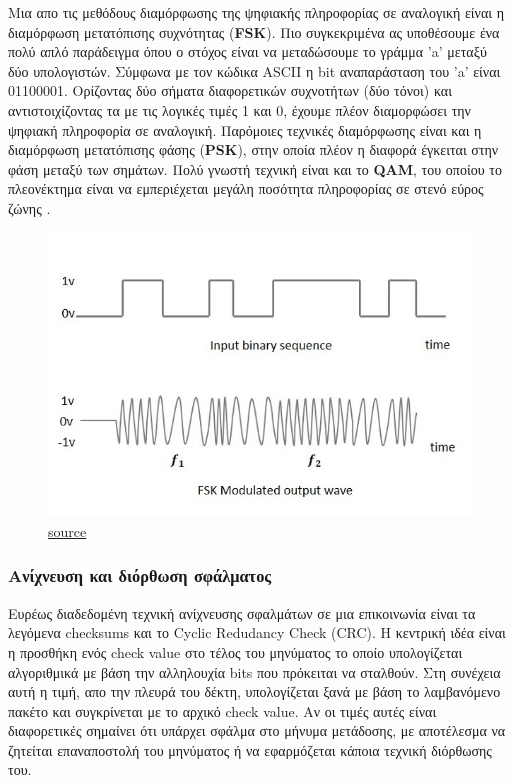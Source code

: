 \documentclass[hidelinks, 12pt, a4paper]{article}
\begin{document}
Μια απο τις μεθόδους διαμόρφωσης της ψηφιακής πληροφορίας σε αναλογική είναι η διαμόρφωση μετατόπισης συχνότητας (\textbf{FSK}). Πιο συγκεκριμένα ας υποθέσουμε ένα πολύ απλό παράδειγμα όπου ο στόχος είναι να μεταδώσουμε το γράμμα 'a' μεταξύ δύο υπολογιστών. Σύμφωνα με τον κώδικα ASCII η bit αναπαράσταση του 'a' είναι 01100001. Ορίζοντας δύο σήματα διαφορετικών συχνοτήτων (δύο τόνοι) και αντιστοιχίζοντας τα με τις λογικές τιμές 1 και 0, έχουμε πλέον διαμορφώσει την ψηφιακή πληροφορία σε αναλογική. Παρόμοιες τεχνικές διαμόρφωσης είναι και η διαμόρφωση μετατόπισης φάσης (\textbf{PSK}), στην οποία πλέον η διαφορά έγκειται στην φάση μεταξύ των σημάτων. Πολύ γνωστή τεχνική είναι και το \textbf{QAM}, του οποίου το πλεονέκτημα είναι  να εμπεριέχεται μεγάλη ποσότητα πληροφορίας σε στενό εύρος ζώνης \cite{fsk}.

\begin{figure}[h!]
\centering
	\includegraphics[keepaspectratio, width=.5\textwidth]{assets/fsk.jpg}
    \caption{\href{https://www.tutorialspoint.com/digital_communication/digital_communication_frequency_shift_keying.htm}{source}}
\end{figure}

\subsubsection{Ανίχνευση και διόρθωση σφάλματος}

Ευρέως διαδεδομένη τεχνική ανίχνευσης σφαλμάτων σε μια επικοινωνία είναι τα λεγόμενα checksums και το Cyclic Redudancy Check (CRC). Η κεντρική ιδέα είναι η προσθήκη ενός check value στο τέλος του μηνύματος το οποίο υπολογίζεται αλγοριθμικά με βάση την αλληλουχία bits που πρόκειται να σταλθούν. Στη συνέχεια αυτή η τιμή, απο την πλευρά του δέκτη, υπολογίζεται ξανά με βάση το λαμβανόμενο πακέτο και συγκρίνεται με το αρχικό check value. Αν οι τιμές αυτές είναι διαφορετικές σημαίνει ότι υπάρχει σφάλμα στο μήνυμα μετάδοσης, με αποτέλεσμα να ζητείται επαναποστολή του μηνύματος ή να εφαρμόζεται κάποια τεχνική διόρθωσης του.
\end{document}
